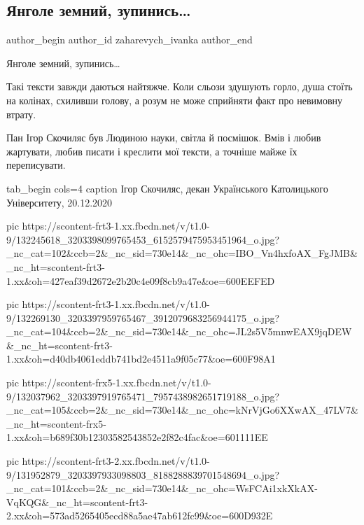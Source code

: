  
 
 
 
 
 
\subsection{Янголе земний, зупинись…}
\label{sec:21_12_2020.fb.zaharevych_ivanka.1.jangole_zemnyy_zupynys}
\ifcmt
	author_begin
   author_id zaharevych_ivanka
	author_end
\fi


Янголе земний, зупинись…

Такі тексти завжди даються найтяжче. Коли сльози здушують горло, душа стоїть на
колінах, схиливши голову, а розум не може сприйняти факт про невимовну втрату.

Пан Ігор Скочиляс був Людиною науки, світла й посмішок. Вмів і любив жартувати,
любив писати і креслити мої тексти, а точніше майже їх переписувати. 

\ifcmt
tab_begin cols=4
	caption Ігор Скочиляс, декан Українського Католицького Університету, 20.12.2020

pic https://scontent-frt3-1.xx.fbcdn.net/v/t1.0-9/132245618_3203398099765453_6152579475953451964_o.jpg?_nc_cat=102&ccb=2&_nc_sid=730e14&_nc_ohc=IBO_Vn4hxfoAX_FgJMB&_nc_ht=scontent-frt3-1.xx&oh=427eaf39d2672e2b20c4e09f8cb9a47e&oe=600EEFED

pic https://scontent-frt3-1.xx.fbcdn.net/v/t1.0-9/132269130_3203397959765467_3912079683256944175_o.jpg?_nc_cat=104&ccb=2&_nc_sid=730e14&_nc_ohc=JL2s5V5mnwEAX9jqDEW&_nc_ht=scontent-frt3-1.xx&oh=d40db4061eddb741bd2e4511a9f05c77&oe=600F98A1

pic https://scontent-frx5-1.xx.fbcdn.net/v/t1.0-9/132037962_3203397919765471_7957438982651719188_o.jpg?_nc_cat=105&ccb=2&_nc_sid=730e14&_nc_ohc=kNrVjGo6XXwAX_47LV7&_nc_ht=scontent-frx5-1.xx&oh=b689f30b12303582543852e2f82c4fac&oe=601111EE

pic https://scontent-frt3-2.xx.fbcdn.net/v/t1.0-9/131952879_3203397933098803_8188288839701548694_o.jpg?_nc_cat=101&ccb=2&_nc_sid=730e14&_nc_ohc=WsFCAi1xkXkAX-VqKQG&_nc_ht=scontent-frt3-2.xx&oh=573ad5265405ecd88a5ae47ab612fc99&oe=600D932E

